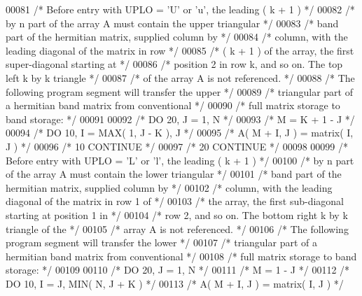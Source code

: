 \begin{DoxyCode}
00081 \textcolor{comment}{/*           Before entry with UPLO = 'U' or 'u', the leading ( k + 1 ) */}
00082 \textcolor{comment}{/*           by n part of the array A must contain the upper triangular */}
00083 \textcolor{comment}{/*           band part of the hermitian matrix, supplied column by */}
00084 \textcolor{comment}{/*           column, with the leading diagonal of the matrix in row */}
00085 \textcolor{comment}{/*           ( k + 1 ) of the array, the first super-diagonal starting at */}
00086 \textcolor{comment}{/*           position 2 in row k, and so on. The top left k by k triangle */}
00087 \textcolor{comment}{/*           of the array A is not referenced. */}
00088 \textcolor{comment}{/*           The following program segment will transfer the upper */}
00089 \textcolor{comment}{/*           triangular part of a hermitian band matrix from conventional */}
00090 \textcolor{comment}{/*           full matrix storage to band storage: */}
00091 
00092 \textcolor{comment}{/*                 DO 20, J = 1, N */}
00093 \textcolor{comment}{/*                    M = K + 1 - J */}
00094 \textcolor{comment}{/*                    DO 10, I = MAX( 1, J - K ), J */}
00095 \textcolor{comment}{/*                       A( M + I, J ) = matrix( I, J ) */}
00096 \textcolor{comment}{/*              10    CONTINUE */}
00097 \textcolor{comment}{/*              20 CONTINUE */}
00098 
00099 \textcolor{comment}{/*           Before entry with UPLO = 'L' or 'l', the leading ( k + 1 ) */}
00100 \textcolor{comment}{/*           by n part of the array A must contain the lower triangular */}
00101 \textcolor{comment}{/*           band part of the hermitian matrix, supplied column by */}
00102 \textcolor{comment}{/*           column, with the leading diagonal of the matrix in row 1 of */}
00103 \textcolor{comment}{/*           the array, the first sub-diagonal starting at position 1 in */}
00104 \textcolor{comment}{/*           row 2, and so on. The bottom right k by k triangle of the */}
00105 \textcolor{comment}{/*           array A is not referenced. */}
00106 \textcolor{comment}{/*           The following program segment will transfer the lower */}
00107 \textcolor{comment}{/*           triangular part of a hermitian band matrix from conventional */}
00108 \textcolor{comment}{/*           full matrix storage to band storage: */}
00109 
00110 \textcolor{comment}{/*                 DO 20, J = 1, N */}
00111 \textcolor{comment}{/*                    M = 1 - J */}
00112 \textcolor{comment}{/*                    DO 10, I = J, MIN( N, J + K ) */}
00113 \textcolor{comment}{/*                       A( M + I, J ) = matrix( I, J ) */}

\end{DoxyCode}
